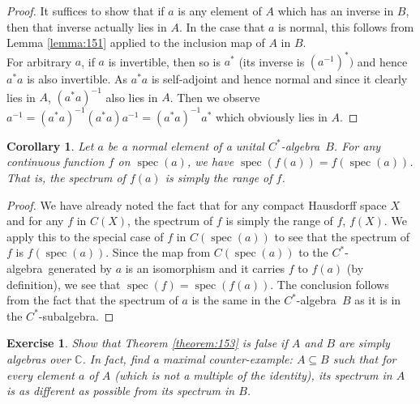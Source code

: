 \documentclass{book}
\newtheorem{exercise}{Exercise}[section]
\newtheorem{corollary}[definition]{Corollary}
\def\cstar{\(C^*\)-algebra}
\begin{document}
\begin{proof}
  It suffices to show that if \(a\) is any element of \(A\) which has an inverse
  in \(B\), then that inverse actually lies in \(A\). In the case that \(a\) is normal, this
  follows from Lemma \ref{lemma:151} applied to the inclusion map of \(A\) in \(B\).\\
  For arbitrary \(a\), if \(a\) is invertible, then so is \(a^*\) (its inverse is \({(a^{-1})}^*)\) and
  hence \(a^*a\) is also invertible. As \(a^*a\) is self-adjoint and hence normal and
  since it clearly lies in \(A\), \({(a^*a)}^{-1}\) also lies in \(A\). Then we observe 
  \(a^{-1} = {(a^*a)}^{-1}(a^*a)a^{-1} = {(a^*a)}^{-1}a^*\) 
  which obviously lies in \(A\).
\end{proof}
\begin{corollary}\label{corollary:154}
  Let \(a\) be a normal element of a unital \cstar\ \(B\). For
  any continuous function \(f\) on \(\operatorname{spec}(a)\), we have \(\operatorname{spec}(f(a)) = f(\operatorname{spec}(a))\).
  That is, the spectrum of \(f(a)\) is simply the range of \(f\).
\end{corollary}
\begin{proof}
  We have already noted the fact that for any compact Hausdorff space
  \(X\) and for any \(f\) in \(C(X)\), the spectrum of \(f\) is simply the range of \(f\), \(f(X)\).
  We apply this to the special case of \(f\) in \(C(\operatorname{spec}(a))\) to see that the spectrum of
  \(f\) is \(f(\operatorname{spec}(a))\). Since the map from \(C(\operatorname{spec}(a))\) to the \cstar\ generated
  by \(a\) is an isomorphism and it carries \(f\) to \(f(a)\) (by definition), we see that
  \(\operatorname{spec}(f) = \operatorname{spec}(f(a))\). The conclusion follows from the fact that the spectrum
  of \(a\) is the same in the \cstar\ \(B\) as it is in the \(C^*\)-subalgebra.
\end{proof}
\begin{exercise}
  Show that Theorem \ref{theorem:153} is false if \(A\) and \(B\) are simply
  algebras over \(\mathbb{C}\). In fact, find a maximal counter-example: \(A \subseteq B\) such
  that for every element \(a\) of \(A\) (which is not a multiple of the identity), its
  spectrum in \(A\) is \textit{as different as possible} from its spectrum in \(B\).
\end{exercise}
\end{document}
